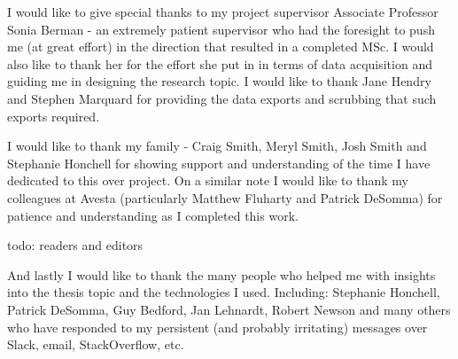 I would like to give special thanks to my project supervisor Associate Professor Sonia Berman - an extremely patient supervisor who had the foresight to push me (at great effort) in the direction that resulted in a completed MSc. I would also like to thank her for the effort she put in in terms of data acquisition and guiding me in designing the research topic. I would like to thank Jane Hendry and Stephen Marquard for providing the data exports and scrubbing that such exports required.

I would like to thank my family - Craig Smith, Meryl Smith, Josh Smith and Stephanie Honchell for showing support and understanding of the time I have dedicated to this over project. On a similar note I would like to thank my colleagues at Avesta (particularly Matthew Fluharty and Patrick DeSomma) for patience and understanding as I completed this work.

todo: readers and editors

And lastly I would like to thank the many people who helped me with insights into the thesis topic and the technologies I used. Including: Stephanie Honchell, Patrick DeSomma, Guy Bedford, Jan Lehnardt, Robert Newson and many others who have responded to my persistent (and probably irritating) messages over Slack, email, StackOverflow, etc.